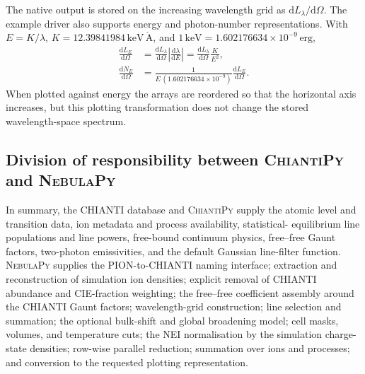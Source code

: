The native output is stored on the increasing wavelength grid as
$\mathrm dL_\lambda/\mathrm d\Omega$.  The example driver also supports energy
and photon-number representations.  With
$E=K/\lambda$, $K=12.39841984\,\mathrm{keV\,\mathring A}$, and
$1\,\mathrm{keV}=1.602176634\times10^{-9}\,\mathrm{erg}$,
\begin{align}
  \frac{\mathrm dL_E}{\mathrm d\Omega}
    &= \frac{\mathrm dL_\lambda}{\mathrm d\Omega}
       \left|\frac{\mathrm d\lambda}{\mathrm dE}\right|
     = \frac{\mathrm dL_\lambda}{\mathrm d\Omega}\frac{K}{E^2},\\
  \frac{\mathrm dN_E}{\mathrm d\Omega}
    &= \frac{1}{E\,(1.602176634\times10^{-9})}
       \frac{\mathrm dL_E}{\mathrm d\Omega}.
\end{align}
When plotted against energy the arrays are reordered so that the horizontal
axis increases, but this plotting transformation does not change the stored
wavelength-space spectrum.

\subsection{Division of responsibility between \textsc{ChiantiPy} and
\textsc{NebulaPy}}

In summary, the CHIANTI database and \textsc{ChiantiPy} supply the atomic level
and transition data, ion metadata and process availability, statistical-
equilibrium line populations and line powers, free-bound continuum physics,
free--free Gaunt factors, two-photon emissivities, and the default Gaussian
line-filter function.  \textsc{NebulaPy} supplies the PION-to-CHIANTI naming
interface; extraction and reconstruction of simulation ion densities; explicit
removal of CHIANTI abundance and CIE-fraction weighting; the free--free
coefficient assembly around the CHIANTI Gaunt factors; wavelength-grid
construction; line selection and summation; the optional bulk-shift and global
broadening model; cell masks, volumes, and temperature cuts; the NEI
normalisation by the simulation charge-state densities; row-wise parallel
reduction; summation over ions and processes; and conversion to the requested
plotting representation.
